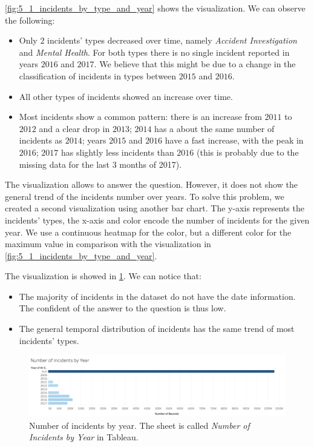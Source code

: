 \cref{fig:5_1_incidents_by_type_and_year} shows the visualization.
We can observe the following:
\begin{itemize}
    \item Only $2$ incidents' types decreased over time, namely \textit{Accident Investigation} and \textit{Mental Health}. For both types there is no single incident reported in years $2016$ and $2017$. We believe that this might be due to a change in the classification of incidents in types between $2015$ and $2016$.
    \item All other types of incidents showed an increase over time.
    \item Most incidents show a common pattern: there is an increase from $2011$ to $2012$ and a clear drop in $2013$; $2014$ has a about the same number of incidents as $2014$; years $2015$ and $2016$ have a fast increase, with the peak in $2016$; $2017$ has slightly less incidents than $2016$ (this is probably due to the missing data for the last $3$ months of 2017).
\end{itemize}

The visualization allows to answer the question.
However, it does not show the general trend of the incidents number over years.
To solve this problem, we created a second visualization using another bar chart.
The y-axis represents the incidents' types, the x-axis and color encode the number of incidents for the given year.
We use a continuous heatmap for the color, but a different color for the maximum value in comparison with the visualization in \cref{fig:5_1_incidents_by_type_and_year}.

The visualization is showed in \cref{fig:5_1_incidents_by_year}.
We can notice that:
\begin{itemize}
    \item The majority of incidents in the dataset do not have the date information. The confident of the answer to the question is thus low.
    \item The general temporal distribution of incidents has the same trend of most incidents' types.
\end{itemize} 

\begin{figure}[h]
	\centering
	\includegraphics[width=0.9\columnwidth]{figures/5_1_incidents_by_year}
	\caption{Number of incidents by year. The sheet is called \textit{Number of Incidents by Year} in Tableau.}
	\label{fig:5_1_incidents_by_year}
\end{figure}

